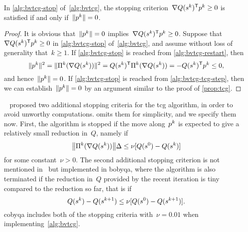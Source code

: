 \begin{proposition}
    \label{prop:bvtcg}
    In \cref{alg:bvtcg-stop} of~\cref{alg:bvtcg}, the stopping criterion~$\nabla Q (\sstep[k])^{\T} \pstep[k] \ge 0$ is satisfied if and only if~$\norm{\pstep[k]} = 0$.
\end{proposition}

\begin{proof}
    It is obvious that~$\norm{\pstep[k]} = 0$ implies~$\nabla Q (\sstep[k])^{\T} \pstep[k] \ge 0$.
    Suppose that~$\nabla Q (\sstep[k])^{\T} \pstep[k] \ge 0$ in \cref{alg:bvtcg-stop} of~\cref{alg:bvtcg}, and assume without loss of generality that~$k \ge 1$.
    If \cref{alg:bvtcg-stop} is reached from \cref{alg:bvtcg-restart}, then
    \begin{equation*}
        \norm{\pstep[k]}^2 = \norm{\Pi^k(\nabla Q(\sstep[k]))}^2 =  Q (\sstep[k])^{\T}  \Pi^k(\nabla Q(\sstep[k])) = - Q (\sstep[k])^{\T}  \pstep[k] \le 0,
    \end{equation*}
    and hence~$\norm{\pstep[k]} = 0$.
    If \cref{alg:bvtcg-stop} is reached from \cref{alg:bvtcg-tcg-step}, then we can establish~$\norm{\pstep[k]} = 0$ by an argument similar to the proof of \cref{prop:tcg}.
\end{proof}

~\cite[\S~3]{Powell_2009} proposed two additional stopping criteria for the
\gls{tcg} algorithm, in order to avoid unworthy computations.
 omits them for simplicity, and we specify them now.
First, the algorithm is stopped if the move along~$\pstep[k]$ is expected to give a relatively small reduction in~$Q$, namely if
\begin{equation}
    \label{eq:bvtcg-stop1}
    \norm[\big]{\Pi^k(\nabla Q(\sstep[k]))} \rad \le \nu [Q(\sstep[0]) - Q(\sstep[k])]
\end{equation}
for some constant~$\nu > 0$.
The second additional stopping criterion is not mentioned in~\cite{Powell_2009} but implemented in
\gls{bobyqa}, where the algorithm is also terminated if the reduction in~$Q$ provided by the recent iteration is tiny compared to the reduction so far, that is if
\begin{equation}
    \label{eq:bvtcg-stop2}
    Q(\sstep[k]) - Q(\sstep[k + 1]) \le \nu [Q(\sstep[0]) - Q(\sstep[k + 1])].
\end{equation}
\Gls{cobyqa} includes both of the stopping criteria with~$\nu = 0.01$ when implementing~\cref{alg:bvtcg}.

